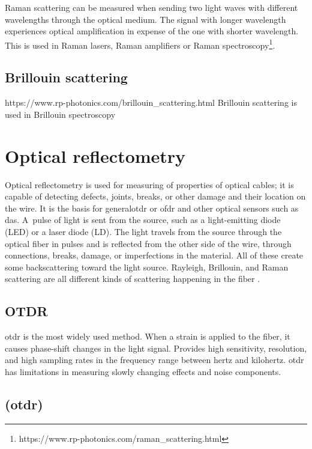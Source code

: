 Raman scattering can be measured when sending two light waves with different wavelengths through the optical medium. The  signal with longer wavelength experiences optical amplification in expense of the one with shorter wavelength. This is used in Raman lasers, Raman amplifiers or Raman spectroscopy\footnote{https://www.rp-photonics.com/raman\_scattering.html}.

\subsection{Brillouin scattering}


https://www.rp-photonics.com/brillouin\_scattering.html
Brillouin scattering is used in Brillouin spectroscopy
\cite{bhundred}

\section{Optical reflectometry}

Optical reflectometry is used for measuring of properties of optical cables; it is capable of detecting defects, joints, breaks, or other damage and their location on the wire. It is the basis for \ac{generalotdr} or \ac{ofdr} and other optical sensors such as \ac{das}. A~pulse of light is sent from the source, such as a light-emitting diode (LED) or a laser diode (LD). The light travels from the source through the optical fiber in pulses and is reflected from the other side of the wire, through connections, breaks, damage, or imperfections in the material. All of these create some backscattering toward the light source. Rayleigh, Brillouin, and Raman scattering are all different kinds of scattering happening in the fiber \cite{progress}. 

\subsection{OTDR}

\ac{otdr} is the most widely used method. When a strain is applied to the fiber, it causes phase-shift changes in the light signal. Provides high sensitivity, resolution, and high sampling rates in the frequency range between hertz and kilohertz. \ac{otdr} has limitations in measuring slowly changing effects and noise components.

\subsection{(\acs{otdr})}   %

